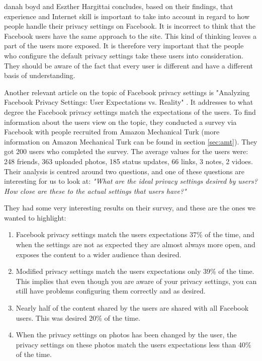 danah boyd and Eszther Hargittai concludes, based on their findings, that experience and Internet skill is important to take into account in regard to how people handle their privacy settings on Facebook. It is incorrect to think that the Facebook users have the same approach to the site. This kind of thinking leaves a part of the users more exposed. It is therefore very important that the people who configure the default privacy settings take these users into consideration. They should be aware of the fact that every user is different and have a different basis of understanding. 

Another relevant article on the topic of Facebook privacy settings is "Analyzing Facebook Privacy Settings: User Expectations vs. Reality" \cite{expectations}. It addresses to what degree the Facebook privacy settings match the expectations of the users. To find information about the users view on the topic, they conducted a survey via Facebook with people recruited from Amazon Mechanical Turk (more information on Amazon Mechanical Turk can be found in section \ref{sec:amt}). They got 200 users who completed the survey. The average values for the users were: 248 friends, 363 uploaded photos, 185 status updates, 66 links, 3 notes, 2 vidoes. Their analysis is centred around two questions, and one of these questions are interesting for us to look at: \emph{"What are the ideal privacy settings desired by users? How close are these to the actual settings that users have?"}

They had some very interesting results on their survey, and these are the ones we wanted to highlight:
\begin{enumerate}
\item Facebook privacy settings match the users expectations 37\% of the time, and when the settings are not as expected they are almost always more open, and exposes the content to a wider audience than desired.  
\item Modified privacy settings match the users expectations only 39\% of the time. This implies that even though you are aware of your privacy settings, you can still have problems configuring them correctly and as desired.
\item Nearly half of the content shared by the users are shared with all Facebook users. This was desired 20\% of the time. 
\item When the privacy settings on photos has been changed by the user, the privacy settings on these photos match the users expectations less than 40\% of the time. 
\end{enumerate}

